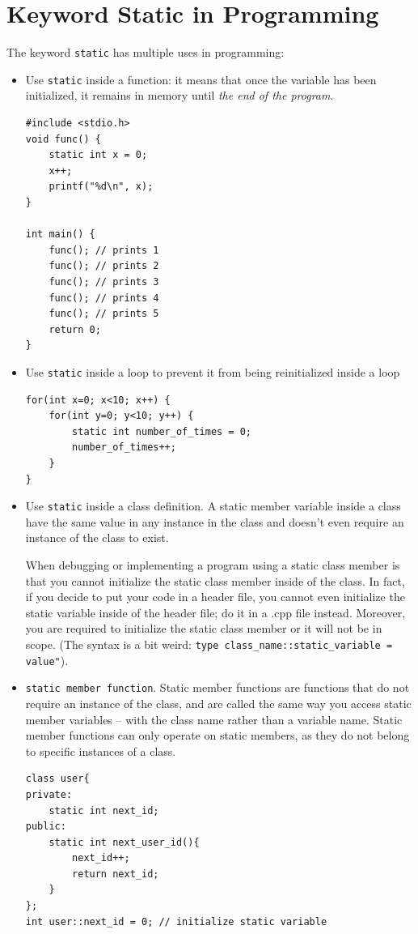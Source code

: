 \section{Keyword Static in Programming}
The keyword \verb|static| has multiple uses in programming:
\begin{itemize}
	\item Use \verb|static| inside a function: it means that once the variable
	has been initialized, it remains in memory until \textit{the end of the program}.
\begin{verbatim}
#include <stdio.h>	
void func() {
  	static int x = 0;
  	x++;
  	printf("%d\n", x); 
}

int main() {
	func(); // prints 1
	func(); // prints 2
	func(); // prints 3
	func(); // prints 4
	func(); // prints 5
	return 0;
}
\end{verbatim}

	\item Use \verb|static| inside a loop to prevent it from being reinitialized
	inside a loop
\begin{verbatim}
for(int x=0; x<10; x++) {
	for(int y=0; y<10; y++) {
		static int number_of_times = 0;
		number_of_times++;
	}
}
\end{verbatim}


	\item Use \verb|static| inside a class definition. A static member 
    variable inside a class have the same value in any instance in the class
    and doesn't even require an instance of the class to exist.
    \begin{remark}
        When debugging or implementing a program using a static class member is that you cannot initialize the static class member inside of the class. In fact, if you decide to put your code in a header file, you cannot even initialize the static variable inside of the header file; do it in a .cpp file instead. Moreover, you are required to initialize the static class member or it will not be in scope. (The syntax is a bit weird: \verb|type class_name::static_variable = value"|).
    \end{remark}
    
   \item \verb|static member function|. Static member functions are functions that do not require an instance of the class, and are called the same way you access static member variables -- with the class name rather than a variable name. Static member functions can only operate on static members, as they do not belong to specific instances of a class.
\begin{verbatim}  
class user{
private:
    static int next_id;
public:
    static int next_user_id(){
        next_id++;
        return next_id;
    }
};
int user::next_id = 0; // initialize static variable
\end{verbatim}


\end{itemize}
